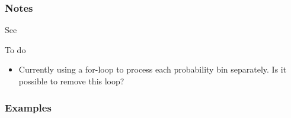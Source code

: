 \documentclass[letterpaper,10pt,english]{sphinxmanual}
\begin{document}
\begin{fulllineitems}
\begin{quote}
\begin{description}
\begin{description}
\end{description}

\end{description}\end{quote}
\subsubsection*{Notes}

See 

To do
\begin{itemize}
\item {} 
Currently using a for-loop to process each probability bin separately. Is it possible                 to remove this loop?

\end{itemize}
\subsubsection*{Examples}


\end{fulllineitems}
\end{document}
